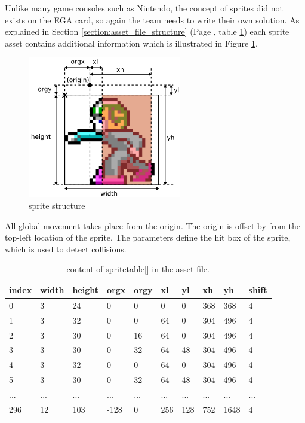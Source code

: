 \documentclass[book.tex]{subfiles}
\begin{document}
Unlike many game consoles such as Nintendo, the concept of sprites did not exists on the EGA card, so again the team needs to write their own solution. As explained in Section \ref{section:asset_file_structure} (Page \pageref{table:spritetable}, table \ref{table:spritetable}) each sprite asset contains additional information which is illustrated in Figure \ref{fig:sprite_structure}.\\
\begin{figure}[H]
  \centering
  \includegraphics[width=0.6\textwidth]{imgs/drawings/sprite.png}
  \caption{sprite structure}
  \label{fig:sprite_structure}
\end{figure}

All global movement takes place from the origin. The origin is offset by  from the top-left location of the sprite. The parameters  define the hit box of the sprite, which is used to detect collisions.\\

\begin{table}[H]
  \begin{tabularx}{\textwidth}[c]{lXXXXXXXXX}
  \hline
  \textbf{index} & \textbf{width} & \textbf{height} & \textbf{orgx} & \textbf{orgy}
    & \textbf{xl} & \textbf{yl} & \textbf{xh} & \textbf{yh} & \textbf{shift} \\ \hline
  0  &   3  &   24  &   0  &   0  &   0  &   0  &   368  &   368  &   4 \\
  1  &   3  &   32  &   0  &   0  &   64  &   0  &   304  &   496  &   4 \\
  2  &   3  &   30  &   0  &   16  &   64  &   0  &   304  &   496  &   4 \\
  3  &   3  &   30  &   0  &   32  &   64  &   48  &   304  &   496  &   4 \\
  4  &   3  &   32  &   0  &   0  &   64  &   0  &   304  &   496  &   4 \\
  5  &   3  &   30  &   0  &   32  &   64  &   48  &   304  &   496  &   4 \\
 ...  &   ...  &   ...  &   ...  &   ...  &   ...  &   ...  &   ...  &   ...  &   ... \\
 296  &   12  &   103  &   -128  &   0  &   256  &   128  &   752  &   1648  &   4\\
  \end{tabularx}
  \caption{content of spritetable[] in the  asset file.}
  \label{table:spritetable}
\end{table}
\end{document}
